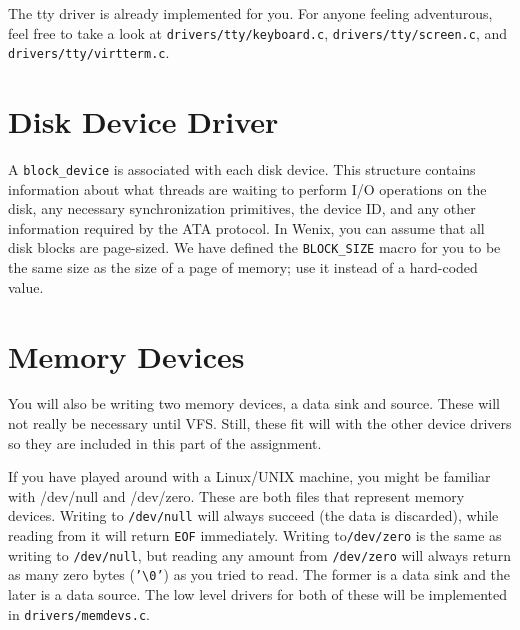 The tty driver is already implemented for you. For anyone feeling adventurous, feel free to take a look at \texttt{drivers/tty/keyboard.c}, \texttt{drivers/tty/screen.c}, and \texttt{drivers/tty/virtterm.c}. 

\section{Disk Device Driver}
A \texttt{block\_device} is associated with each disk device. This structure contains information about what threads are waiting to perform I/O operations on the disk, any necessary synchronization primitives, the device ID, and any other information required by the ATA protocol. In Wenix, you can assume that all disk blocks are page-sized. We have defined the \texttt{BLOCK\_SIZE} macro for you to be the same size as the size of a page of memory; use it instead of a hard-coded value. 

\section{Memory Devices}
You will also be writing two memory devices, a data sink and source. These will not really be necessary until VFS. Still, these fit will with the other device drivers so they are included in this part of the assignment.

If you have played around with a Linux/UNIX machine, you might be familiar with /dev/null and /dev/zero. These are both files that represent memory devices. Writing to \texttt{/dev/null} will always succeed (the data is discarded), while reading from it will return \texttt{EOF} immediately. Writing to\texttt{/dev/zero} is the same as writing to \texttt{/dev/null}, but reading any amount from \texttt{/dev/zero} will always return as many zero bytes (\texttt{'\textbackslash0'}) as you tried to read. The former is a data sink and the later is a data source. The low level drivers for both of these will be implemented in \texttt{drivers/memdevs.c}. 

